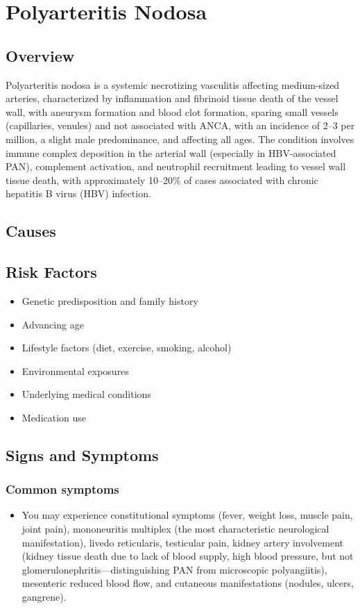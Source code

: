 \chapter{Polyarteritis Nodosa}
\label{sec:Polyarteritis Nodosa}

\section{Overview}
Polyarteritis nodosa is a systemic necrotizing vasculitis affecting medium-sized arteries, characterized by inflammation and fibrinoid tissue death of the vessel wall, with aneurysm formation and blood clot formation, sparing small vessels (capillaries, venules) and not associated with ANCA, with an incidence of 2--3 per million, a slight male predominance, and affecting all ages. The condition involves immune complex deposition in the arterial wall (especially in HBV-associated PAN), complement activation, and neutrophil recruitment leading to vessel wall tissue death, with approximately 10--20\% of cases associated with chronic hepatitis B virus (HBV) infection.
\section{Causes}
\section{Risk Factors}

\begin{itemize}[noitemsep]
  \item Genetic predisposition and family history
  \item Advancing age
  \item Lifestyle factors (diet, exercise, smoking, alcohol)
  \item Environmental exposures
  \item Underlying medical conditions
  \item Medication use
\end{itemize}
\section{Signs and Symptoms}

\subsection{Common symptoms}
\begin{itemize}[noitemsep]
  \item You may experience constitutional symptoms (fever, weight loss, muscle pain, joint pain), mononeuritis multiplex (the most characteristic neurological manifestation), livedo reticularis, testicular pain, kidney artery involvement (kidney tissue death due to lack of blood supply, high blood pressure, but not glomerulonephritis---distinguishing PAN from microscopic polyangiitis), mesenteric reduced blood flow, and cutaneous manifestations (nodules, ulcers, gangrene). 
  \end{itemize}

